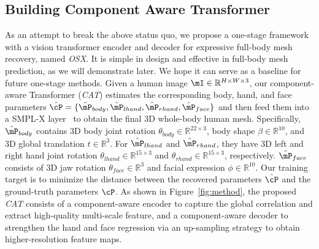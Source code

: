 \documentclass[10pt,twocolumn,letterpaper]{article}
\newcommand{\modelname}{\emph{OSX}\xspace}
\begin{document}
\subsection{Building Component Aware Transformer}
\label{sec:method_1}

 As an attempt to break the above status quo, we propose a one-stage framework with a vision transformer encoder and decoder for expressive full-body mesh recovery, named \modelname. It is simple in design and effective in full-body mesh prediction, as we will demonstrate later. We hope it can serve as a baseline for future one-stage methods.
Given a human image $\mI \in \mathbb{R}^{H \times W \times 3}$, our component-aware Transformer (\emph{CAT}) estimates the corresponding body, hand, and face parameters $\hat{\cP}= \{\hat{\mP}_{body}, \hat{\mP}_{lhand}, \hat{\mP}_{rhand}, \hat{\mP}_{face}\}$ and then feed them into a SMPL-X layer~\cite{Pavlakos_2019smplx} to obtain the final 3D whole-body human mesh. 
Specifically, $\hat{\mP}_{body}$ contains 3D body joint rotation $\theta_{body} \in \mathbb{R}^{22 \times 3}$, body shape $\beta\in \mathbb{R}^{10}$, and 3D global translation $t\in \mathbb{R}^{3}$. For $\hat{\mP}_{lhand}$ and $\hat{\mP}_{rhand}$, they have 3D left and right hand joint rotation $\theta_{lhand} \in \mathbb{R}^{15 \times 3}$ and $\theta_{rhand} \in \mathbb{R}^{15 \times 3}$, respectively. 
$\hat{\mP}_{face}$ consists of 3D jaw rotation $\theta_{face}\in \mathbb{R}^{3}$ and facial expression $\phi \in \mathbb{R}^{10}$.
Our training target is to minimize the distance between the recovered parameters $\hat{\cP}$ and the ground-truth parameters $\cP$. As shown in Figure~\ref{fig:method}, the proposed \emph{CAT} consists of a component-aware encoder to capture the global correlation and extract high-quality multi-scale feature, and a component-aware decoder to strengthen the hand and face regression via an up-sampling strategy to obtain higher-resolution feature maps.
\end{document}
